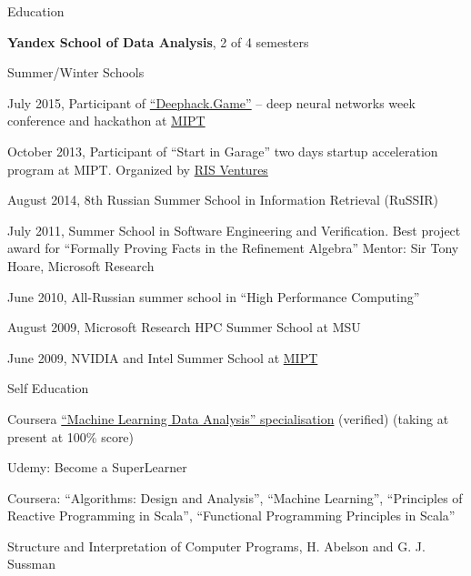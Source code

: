 \documentclass{resume} %
\begin{document}
\begin{rSection}{Education}

\textbf{Yandex School of Data Analysis}, 2 of 4 semesters


\begin{rSubsectionSchools}{Summer/Winter Schools}
\item July 2015, Participant of \href{http://game.deephack.me/}{``Deephack.Game''} -- deep neural
networks week conference and hackathon at \href{http://mipt.ru/}{MIPT}
\item October 2013, Participant of ``Start in Garage'' two days startup acceleration program at
MIPT. Organized by \href{http://www.risventures.com/}{RIS Ventures}
\item August 2014, 8th Russian Summer School in Information Retrieval (RuSSIR)
\item July 2011, Summer School in Software Engineering and Verification. Best project award for
``Formally Proving Facts in the Refinement Algebra'' Mentor: Sir Tony Hoare, Microsoft Research
\item June 2010, All-Russian summer school in ``High Performance Computing''
\item August 2009, Microsoft Research HPC Summer School at MSU
\item June 2009, NVIDIA and Intel Summer School at \href{http://mipt.ru/}{MIPT}
\end{rSubsectionSchools}


\begin{rSubsectionSchools}{Self Education}
\item Coursera
\href{https://www.coursera.org/specializations/machine-learning-data-analysis}{``Machine Learning
Data Analysis'' specialisation} (verified) (taking at present at 100\% score)
\item Udemy: Become a SuperLearner
\item Coursera: ``Algorithms: Design and Analysis'', ``Machine Learning'', ``Principles of Reactive
Programming in Scala'', ``Functional Programming Principles in Scala''
\item Structure and Interpretation of Computer Programs, H. Abelson and G. J. Sussman
\end{rSubsectionSchools}

\end{rSection}
\end{document}
